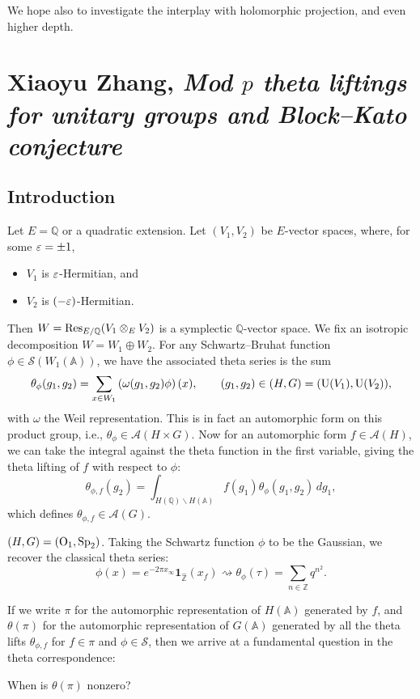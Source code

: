 \documentclass[reqno]{amsart} 
\numberwithin{theorem}{section}
\numberwithin{equation}{section}
\begin{document}
We hope also to investigate the interplay with holomorphic projection, and even higher depth.

\section{Xiaoyu Zhang, \emph{Mod $p$ theta liftings for unitary groups and Block--Kato conjecture}}

\subsection{Introduction}

Let $E = \mathbb{Q}$ or a quadratic extension.  Let $(V_1, V_2)$ be $E$-vector spaces, where, for some $\varepsilon = \pm 1$,
\begin{itemize}
\item $V_1$ is $\varepsilon$-Hermitian, and
\item $V_2$ is $(- \varepsilon)$-Hermitian.
\end{itemize}
Then $W = \operatorname{Res}_{E / \mathbb{Q}}(V_1 \otimes_E V_2)$ is a symplectic $\mathbb{Q}$-vector space.  We fix an isotropic decomposition $W = W_1 \oplus W_2$.  For any Schwartz--Bruhat function $\phi \in \mathcal{S}(W_1(\mathbb{A}))$, we have the associated theta series is the sum
\begin{equation*}
  \theta_\phi(g_1, g_2) = \sum_{x \in W_1} \left( \omega(g_1, g_2) \phi \right)(x), \qquad
  (g_1, g_2) \in(H, G) =(\operatorname{U}(V_1), \operatorname{U}(V_2)),
\end{equation*}
with $\omega$ the Weil representation.  This is in fact an automorphic form on this product group, i.e., $\theta_\phi \in \mathcal{A}(H \times G)$.  Now for an automorphic form $f \in \mathcal{A}(H)$, we can take the integral against the theta function in the first variable, giving the theta lifting of $f$ with respect to $\phi$:
\begin{equation*}
  \theta_{\phi, f}(g_2) = \int_{H(\mathbb{Q}) \backslash H(\mathbb{A})} f(g_1) \theta_\phi(g_1, g_2) \, d g_1,
\end{equation*}
which defines $\theta_{\phi, f} \in \mathcal{A}(G)$.

\begin{example}
  $(H, G) =(\operatorname{O}_1 , \operatorname{Sp}_2)$.  Taking the Schwartz function $\phi$ to be the Gaussian, we recover the classical theta series:
  \begin{equation*}
    \phi(x) = e^{- 2 \pi x_\infty} \mathbf{1}_{\hat{\mathbb{Z}}}(x_f)
    \rightsquigarrow
    \theta_\phi(\tau) = \sum_{n \in \mathbb{Z}} q^{n^2}.
  \end{equation*}
\end{example}
If we write $\pi$ for the automorphic representation of $H(\mathbb{A})$ generated by $f$, and $\theta(\pi)$ for the automorphic representation of $G(\mathbb{A})$ generated by all the theta lifts $\theta_{\phi, f}$ for $f \in \pi$ and $\phi \in \mathcal{S}$, then we arrive at a fundamental question in the theta correspondence:
\begin{question}
  When is $\theta(\pi)$ nonzero?
\end{question}
\end{document}

